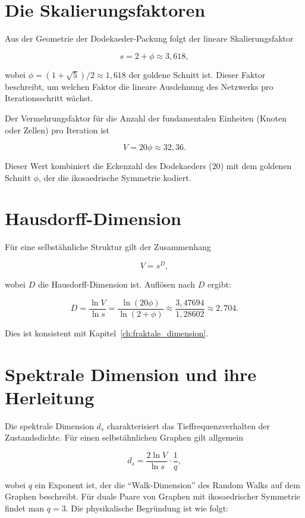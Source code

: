 \section{Die Skalierungsfaktoren}
\label{app:spektrale_skalierung}

Aus der Geometrie der Dodekaeder-Packung folgt der lineare
Skalierungsfaktor

\[
s = 2 + \phi \approx 3,618,
\]

wobei \(\phi = (1+\sqrt{5})/2 \approx 1,618\) der goldene Schnitt ist.
Dieser Faktor beschreibt, um welchen Faktor die lineare Ausdehnung des
Netzwerks pro Iterationsschritt wächst.

Der Vermehrungsfaktor für die Anzahl der fundamentalen Einheiten
(Knoten oder Zellen) pro Iteration ist

\[
V = 20\phi \approx 32,36.
\]

Dieser Wert kombiniert die Eckenzahl des Dodekaeders (\(20\)) mit dem
goldenen Schnitt \(\phi\), der die ikosaedrische Symmetrie kodiert.

\section{Hausdorff-Dimension}
\label{app:spektrale_hausdorff}

Für eine selbstähnliche Struktur gilt der Zusammenhang

\[
V = s^{D},
\]

wobei \(D\) die Hausdorff-Dimension ist. Auflösen nach \(D\) ergibt:

\[
D = \frac{\ln V}{\ln s}
    = \frac{\ln(20\phi)}{\ln(2+\phi)}
    \approx \frac{3,47694}{1,28602}
    \approx 2,704.
\]

Dies ist konsistent mit Kapitel~\ref{ch:fraktale_dimension}.

\section{Spektrale Dimension und ihre Herleitung}
\label{app:spektrale_herleitung}

Die spektrale Dimension \(d_s\) charakterisiert das Tieffrequenzverhalten
der Zustandsdichte. Für einen selbstähnlichen Graphen gilt allgemein

\[
d_s = \frac{2 \ln V}{\ln s} \cdot \frac{1}{q},
\]

wobei \(q\) ein Exponent ist, der die \enquote{Walk-Dimension} des
Random Walks auf dem Graphen beschreibt. Für duale Paare von Graphen
mit ikosaedrischer Symmetrie findet man \(q = 3\). Die physikalische
Begründung ist wie folgt:

